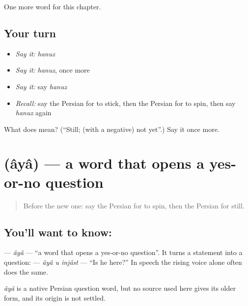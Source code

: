 \begin{grammarlens}[title={What you've built}]
One more word for this chapter.
\end{grammarlens}

\subsection*{Your turn}
\begin{itemize}
\raggedright
  \item \emph{Say it:} \emph{hanuz}
  \item \emph{Say it:} \emph{hanuz}, once more
  \item \emph{Say it:} say \emph{hanuz}
  \item \emph{Recall:} say the Persian for to stick, then the Persian for to spin, then say \emph{hanuz} again
\end{itemize}

\begin{tcolorbox}[breakable,colback=teal!4,colframe=teal!35!black,title={Before you move on}]
What does  mean? (\textquotedblleft{}Still; (with a negative) not yet\textquotedblright{}.) Say it once more.
\end{tcolorbox}
\section[\texorpdfstring{\fa{آیا} (âyâ)}{آیا (âyâ)}]{ (âyâ) — a word that opens a yes-or-no question}

\label{lesson:FA-C136-aya}



\begin{quote}
Before the new one: say the Persian for to spin, then the Persian for still.
\end{quote}

\subsection*{You'll want to know: }
\textbf{} — \emph{âyâ} — \textquotedblleft{}a word that opens a yes-or-no question\textquotedblright{}. It turns a statement into a question: \textbf{  } — \emph{âyâ u injâst} — \textquotedblleft{}Is he here?\textquotedblright{} In speech the rising voice alone often does the same.

\begin{cousinweb}
\emph{âyâ} is a native Persian question word, but no source used here gives its older form, and its origin is not settled.
\end{cousinweb}

